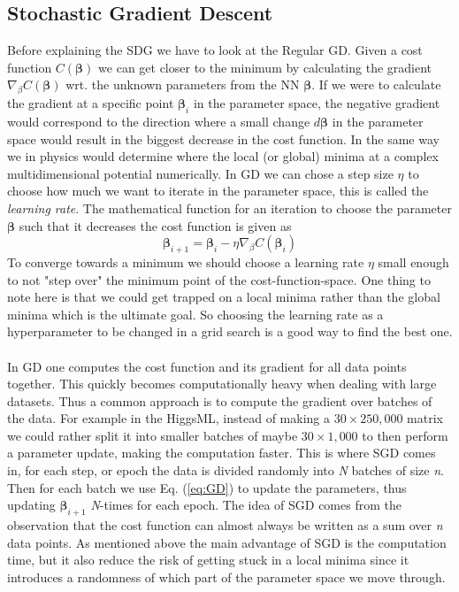 \documentclass[14pt, a4paper]{book}
\begin{document}
\subsection{Stochastic Gradient Descent}
Before explaining the SDG we have to look at the Regular GD. Given a cost function $C(\bm{\beta})$ we can get closer to the minimum by calculating the gradient $\nabla_{\beta}C(\bm{\beta})$ wrt. the unknown parameters from the NN $\bm\beta$. If we were to calculate the gradient at a specific point $\bm{\beta}_i$ in the parameter space, the negative gradient would correspond to the direction where a small change $d\bm\beta$ in the parameter space would result in the biggest decrease in the cost function. In the same way we in physics would determine where the local (or global) minima at a complex multidimensional potential numerically. In GD we can chose a step size $\eta$ to choose how much we want to iterate in the parameter space, this is called the \textit{learning rate}. The mathematical function for an iteration to choose the parameter $\bm{\beta}$ such that it decreases the cost function is given as
\begin{equation}\label{eq:GD}
    \bm{\beta}_{i+1}=\bm{\beta}_{i} -\eta\nabla_{\beta}C(\bm{\beta}_i)
\end{equation}
To converge towards a minimum we should choose a learning rate $\eta$ small enough to not "step over" the minimum point of the cost-function-space. One thing to note here is that we could get trapped on a local minima rather than the global minima which is the ultimate goal. So choosing the learning rate as a hyperparameter to be changed in a grid search is a good way to find the best one.\\
\\In GD one computes the cost function and its gradient for all data points together. This quickly becomes computationally heavy when dealing with large datasets. Thus a common approach is to compute the gradient over batches of the data. For example in the HiggsML, instead of making a $30\times250,000$ matrix we could rather split it into smaller batches of maybe $30\times1,000$ to then perform a parameter update, making the computation faster. This is where SGD comes in, for each step, or epoch the data is divided randomly into \textit{N} batches of size \textit{n}. Then for each batch we use Eq. (\ref{eq:GD}) to update the parameters, thus updating $\bm{\beta}_{i+1}$ \textit{N}-times for each epoch. The idea of SGD comes from the observation that the cost function can almost always be written as a sum over \textit{n} data points. As mentioned above the main advantage of SGD is the computation time, but it also reduce the risk of getting stuck in a local minima since it introduces a randomness of which part of the parameter space we move through.
\end{document}

